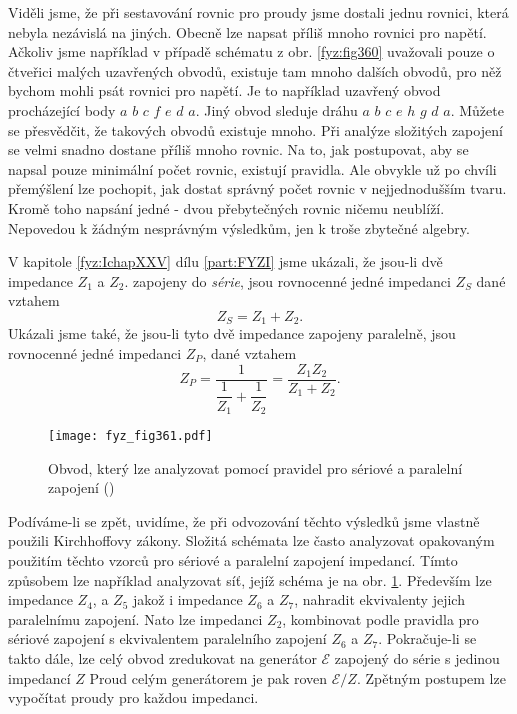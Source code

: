 {  Viděli jsme, že při sestavování rovnic pro proudy jsme dostali jednu rovnici, která nebyla 
  nezávislá na jiných. Obecně lze napsat příliš mnoho rovnici pro napětí. Ačkoliv jsme například v 
  případě schématu z obr. \ref{fyz:fig360} uvažovali pouze o čtveřici malých uzavřených obvodů, 
  existuje tam mnoho dalších obvodů, pro něž bychom mohli psát rovnici pro napětí. Je to například 
  uzavřený obvod procházející body \(a\) \(b\) \(c\) \(f\) \(e\) \(d\) \(a\). Jiný obvod sleduje 
  dráhu \(a\) \(b\) \(c\) \(e\) \(h\) \(g\) \(d\) \(a\). Můžete se přesvědčit, že takových obvodů 
  existuje mnoho. Při analýze složitých zapojení se velmi snadno dostane příliš mnoho rovnic. Na 
  to, jak postupovat, aby se napsal pouze minimální počet rovnic, existují pravidla. Ale obvykle už 
  po chvíli přemýšlení lze pochopit, jak dostat správný počet rovnic v nejjednodušším tvaru. Kromě 
  toho napsání jedné - dvou přebytečných rovnic ničemu neublíží. Nepovedou k žádným nesprávným 
  výsledkům, jen k troše zbytečné algebry.
   
  V kapitole \ref{fyz:IchapXXV} dílu \ref{part:FYZI} jsme ukázali, že jsou-li dvě impedance \(Z_1\) 
  a \(Z_2\). zapojeny do \emph{série}, jsou rovnocenné jedné impedanci \(Z_S\) dané vztahem
  \begin{equation}\label{fyz:eq487}
    Z_S = Z_1 + Z_2.
  \end{equation}
  Ukázali jsme také, že jsou-li tyto dvě impedance zapojeny paralelně, jsou rovnocenné jedné 
  impedanci \(Z_P\), dané vztahem
  \begin{equation}\label{fyz:eq488}
    Z_P = \dfrac{1}{\dfrac{1}{Z_1} + \dfrac{1}{Z_2}} = \frac{Z_1Z_2}{Z_1 + Z_2}.
  \end{equation}
  
  \begin{figure}[ht!] %
    \centering
    \texttt{[image: fyz\_fig361.pdf]}
    \caption{Obvod, který lze analyzovat pomocí pravidel pro sériové a paralelní zapojení
             (\cite[s.~402]{Feynman02})}
    \label{fyz:fig361}
  \end{figure}
  
  Podíváme-li se zpět, uvidíme, že při odvozování těchto výsledků jsme vlastně použili Kirchhoffovy 
  zákony. Složitá schémata lze často analyzovat opakovaným použitím těchto vzorců pro sériové a 
  paralelní zapojení impedancí. Tímto způsobem lze například analyzovat síť, jejíž schéma je na 
  obr. \ref{fyz:fig361}. Především lze impedance \(Z_4\), a \(Z_5\) jakož i impedance \(Z_6\) a 
  \(Z_7\), nahradit ekvivalenty jejich paralelnímu zapojení. Nato lze impedanci \(Z_2\), kombinovat 
  podle pravidla pro sériové zapojení s ekvivalentem paralelního zapojení \(Z_6\) a \(Z_7\). 
  Pokračuje-li se takto dále, lze celý obvod zredukovat na generátor \(\mathscr{E}\) zapojený do 
  série s jedinou impedancí \(Z\) Proud celým generátorem je pak roven \(\mathscr{E}/Z\). Zpětným 
  postupem lze vypočítat proudy pro každou impedanci.

}
